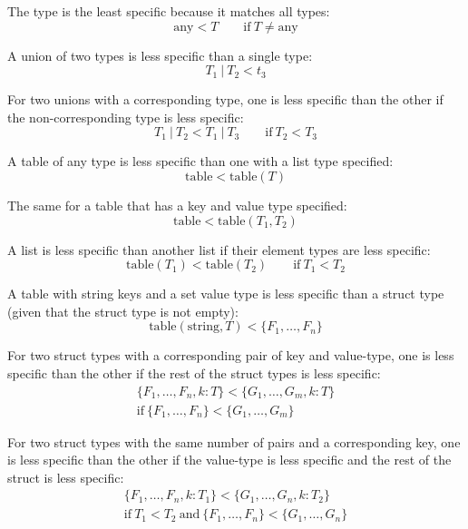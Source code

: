The  type is the least specific because it matches all types:
\[ \mathrm{any} < T \qquad\mathrm{if~} T \neq \mathrm{any} \]

A union of two types is less specific than a single type:
\[ T_1\ |\ T_2 < t_3 \]

For two unions with a corresponding type, one is less specific than the other if the non-corresponding type is less specific:
\[ T_1\ |\ T_2 < T_1\ |\ T_3 \qquad\mathrm{if~} T_2 < T_3 \]

A table of any type is less specific than one with a list type specified:
\[ \mathrm{table} < \mathrm{table}(T) \]

The same for a table that has a key and value type specified:
\[ \mathrm{table} < \mathrm{table}(T_1, T_2) \]

A list is less specific than another list if their element types are less specific:
\[ \mathrm{table}(T_1) < \mathrm{table}(T_2) \qquad\mathrm{if~} T_1 < T_2 \]

A table with string keys and a set value type is less specific than a struct type (given that the struct type is not empty):
\[ \mathrm{table}(\mathrm{string}, T) < \{F_1, \dots, F_n\} \]

For two struct types with a corresponding pair of key and value-type, one is less specific than the other if the rest of the struct types is less specific:
\begin{multline*}
\{F_1, \dots, F_n, k: T\} < \{G_1, \dots, G_m, k: T\} \\
\mathrm{if~} \{F_1, \dots, F_n\} < \{G_1, \dots, G_m\}
\end{multline*}

For two struct types with the same number of pairs and a corresponding key, one is less specific than the other if the value-type is less specific and the rest of the struct is less specific:
\begin{multline*}
\{F_1, \dots, F_n, k: T_1\} < \{G_1, \dots, G_n, k: T_2\} \\
\mathrm{if~} T_1 < T_2 \mathrm{~and~} \{F_1, \dots, F_n\} < \{G_1, \dots, G_n\}
\end{multline*}


